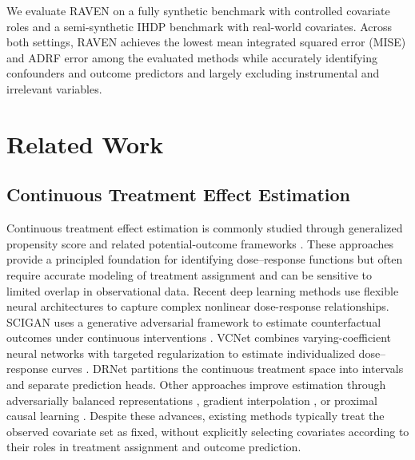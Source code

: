 \documentclass[twoside]{article}
\theoremstyle{plain}
\theoremstyle{definition}
\theoremstyle{remark}
\newtheorem{proof sketch}[theorem]{Proof Sketch}
\begin{document}
{We evaluate RAVEN on a fully synthetic benchmark with controlled covariate roles and a semi-synthetic IHDP benchmark with real-world covariates. Across both settings, RAVEN achieves the lowest mean integrated squared error (MISE) and ADRF error among the evaluated methods while accurately identifying confounders and outcome predictors and largely excluding instrumental and irrelevant variables. 


\vspace{-0.5em}
\section{Related Work}
\vspace{-0.5em}
\subsection{Continuous Treatment Effect Estimation}
Continuous treatment effect estimation is commonly studied through generalized propensity score and related potential-outcome frameworks \citep{hirano2004propensity, imai2004causal}. 
These approaches provide a principled foundation for identifying dose--response functions but often require accurate modeling of treatment assignment and can be sensitive to limited overlap in observational data.  
Recent deep learning methods use flexible neural architectures to capture complex nonlinear dose-response relationships. 
SCIGAN uses a generative adversarial framework to estimate counterfactual outcomes under continuous interventions \citep{bica2020estimating}. VCNet combines varying-coefficient neural networks with targeted regularization to estimate individualized dose--response curves \citep{nie2021vcnet}. 
DRNet \citep{schwab2020learning} partitions the continuous treatment space into intervals and separate prediction heads. 
Other approaches improve estimation through adversarially balanced representations \citep{kazemi2024adversarially}, gradient interpolation \citep{nagalapatti2024continuous}, or proximal causal learning \citep{wu2023doubly}. 
Despite these advances, existing methods typically treat the observed covariate set as fixed, without explicitly selecting covariates according to their roles in treatment assignment and outcome prediction. 


}
\end{document}

